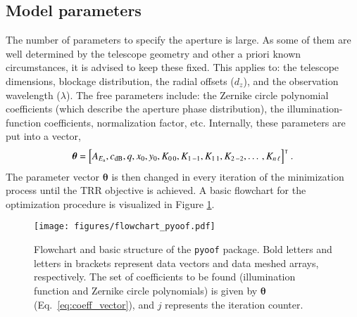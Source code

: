 \documentclass[
    ]
    {aa}
\begin{document}
    \subsection{Model parameters}
    The number of parameters to specify the aperture is large. As some of them are well determined by the telescope geometry and other a priori known circumstances, it is advised to keep these fixed. This applies to: the telescope dimensions, blockage distribution, the radial offsets ($d_z$), and the observation wavelength ($\lambda$). The free parameters include: the Zernike circle polynomial coefficients (which describe the aperture phase distribution), the illumination-function coefficients, normalization factor, etc. 
    Internally, these parameters are put into a vector,  
    \begin{equation}
        \boldsymbol{\theta} = \sbr{A_{E_\text{a}}, c_\text{dB}, q, x_0, y_0, K_{0\,0}, K_{1\,-1}, K_{1\,1}, K_{2\,-2}, \dotso, K_{n\,\ell} }^\intercal.
        \label{eq:coeff_vector}
    \end{equation}
    The parameter vector $\boldsymbol\theta$ is then changed in every iteration of the minimization process until the TRR objective is achieved. A basic flowchart for the optimization procedure is visualized in Figure \ref{fig:flowchart_pyoof}.

    \begin{figure}
        \centering
        \texttt{[image: figures/flowchart\_pyoof.pdf]}
        \caption{Flowchart and basic structure of the \texttt{pyoof} package. Bold letters and letters in brackets represent data vectors and data meshed arrays, respectively. The set of coefficients to be found (illumination function and Zernike circle polynomials) is given by $\boldsymbol\theta$ (Eq.~\ref{eq:coeff_vector}), and $j$ represents the iteration counter.}
        \label{fig:flowchart_pyoof}
    \end{figure}
\end{document}
